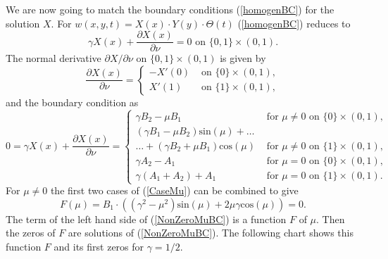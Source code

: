 \documentclass[a4paper,11pt]{article}
\theoremstyle{plain} %
\theoremstyle{definition} %
\theoremstyle{remark} %
\theoremstyle{remark}
\begin{document}
We are now going to match the boundary conditions (\ref{homogenBC}) for the solution $X$. For $w (x,y,t) = X(x)\cdot Y(y) \cdot \Theta (t) $ (\ref{homogenBC}) reduces to
\begin{equation*}
\gamma X(x) + \frac{\partial X(x) }{\partial \nu } = 0 \text{ on } \{ 0,1\}\times (0,1) .
\end{equation*}
The normal derivative $ \partial X / \partial \nu $ on $ \{ 0,1\}\times (0,1) $ is given by
\begin{equation*}
\frac{\partial X(x) }{\partial \nu } =
\begin{cases}
-X'(0) & \text{ on } \{ 0\}\times (0,1), \\
X'(1) & \text{ on } \{ 1\}\times (0,1) ,
\end{cases}
\end{equation*}
and the boundary condition as
\begin{equation}
0 = \gamma X(x) + \frac{\partial X(x) }{\partial \nu } =
\begin{cases}
\gamma B_2 - \mu B_1  & \text{ for } \mu \not= 0 \text{ on } \{ 0\}\times (0,1), \label{CaseMu}\\
(\gamma B_1 - \mu B_2) \mathrm{sin}(\mu ) + \dots\\
\dots +  (\gamma B_2 + \mu B_1) \mathrm{cos }(\mu ) & \text{ for } \mu \not= 0 \text{ on } \{ 1\}\times (0,1), \\
\gamma A_2 - A_1 & \text{ for } \mu = 0 \text{ on } \{ 0\}\times (0,1), \\
\gamma (A_1 + A_2 ) + A_1 & \text{ for } \mu = 0 \text{ on } \{ 1\}\times (0,1) .
\end{cases}
\end{equation}
For $ \mu \not= 0 $ the first two cases of (\ref{CaseMu}) can be combined to give
\begin{equation} \label{NonZeroMuBC}
F(\mu ) =  B_1 \cdot \left((\gamma^2  - \mu^2) \mathrm{sin}(\mu ) + 2 \mu \gamma \mathrm{cos}(\mu ) \right) = 0 .
\end{equation}
The term of the left hand side of (\ref{NonZeroMuBC}) is a function $F$ of $\mu $. Then the zeros of $F$ are solutions of (\ref{NonZeroMuBC}). The following chart shows this function $F$ and its first zeros for $\gamma = 1/2 $.
%
\end{document}
